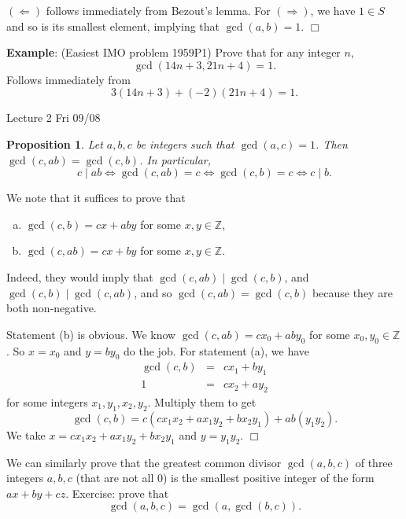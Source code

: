 \documentclass{article}
\def\Z{{\mathbb Z}}
\def\Z{{\mathbb Z}}
\newtheorem{proposition}[subsection]{Proposition}
\newenvironment{proof}{\noindent {\bf Proof:}}{$\Box$ \vspace{2 ex}}
\newcommand{\add}[1]{{\color{blue} #1}}
\begin{document}
\begin{proof}
    $(\Leftarrow)$ follows immediately from Bezout's lemma. For $(\Rightarrow)$, we have $1\in S$ and so is its smallest element, implying that $\gcd(a,b) = 1$.
\end{proof}

\noindent\textbf{Example}: (Easiest IMO problem 1959P1) Prove that for any integer $n$, $$\gcd(14n+3, 21n+4) = 1.$$
Follows immediately from $$3(14n+3) + (-2)(21n+4) = 1.$$

\begin{center}
    \add{Lecture 2 Fri 09/08}
\end{center}

\begin{proposition}\label{prop:CAD}
    Let $a,b,c$ be integers such that $\gcd(a,c) = 1$. Then $\gcd(c, ab) = \gcd(c, b)$. In particular, $$c\mid ab \Longleftrightarrow \gcd(c,ab) = c\Longleftrightarrow\gcd(c,b) = c\Longleftrightarrow c\mid b.$$
\end{proposition}

\begin{proof}
    We note that it suffices to prove that 
    \begin{enumerate}[(a)]
        \item $\gcd(c,b) = cx + aby$ for some $x,y\in\Z$,
        \item $\gcd(c, ab) = cx + by$ for some $x,y\in\Z$.
    \end{enumerate}
    Indeed, they would imply that $\gcd(c,ab)\mid\gcd(c,b)$, and $\gcd(c,b)\mid\gcd(c,ab)$, and so $\gcd(c, ab) = \gcd(c, b)$ because they are both non-negative.

    Statement (b) is obvious. We know $\gcd(c,ab) = cx_0 + aby_0$ for some $x_0,y_0\in\Z$. So $x = x_0$ and $y = by_0$ do the job. For statement (a), we have
    \begin{eqnarray*}
        \gcd(c,b) &=& cx_1 + by_1\\
        1 &=& cx_2 + ay_2
    \end{eqnarray*}
    for some integers $x_1,y_1,x_2,y_2$. Multiply them to get
    $$\gcd(c,b) = c(cx_1x_2 + ax_1y_2+bx_2y_1) + ab(y_1y_2).$$
    We take $x = cx_1x_2 + ax_1y_2+bx_2y_1$ and $y = y_1y_2$.
\end{proof}

We can similarly prove that the greatest common divisor $\gcd(a,b,c)$ of three integers $a,b,c$ (that are not all $0$) is the smallest positive integer of the form $ax + by + cz$. Exercise: prove that
$$\gcd(a,b,c) = \gcd(a,\gcd(b,c)).$$
\end{document}
